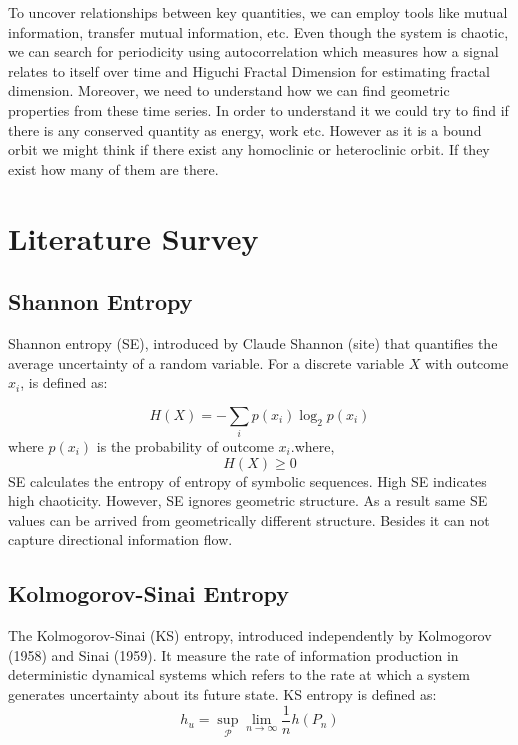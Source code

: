 \documentclass[%
reprint,
amsmath,amssymb,
aps,
floatfix,
]{revtex4-2}
\begin{document}
	To uncover relationships between key quantities, we can employ tools like mutual information, transfer mutual information, etc. Even though the system is chaotic, we can search for periodicity using autocorrelation which measures how a signal relates to itself over time and Higuchi Fractal Dimension for estimating fractal dimension.  Moreover, we need to understand how we can find geometric properties from these time series.
	In order to understand it we could try to find if there is any conserved quantity as energy, work etc. However as it is a bound orbit we might think if there exist any homoclinic or heteroclinic orbit. If they exist how many of them are there. 
	\section{Literature Survey}
	\subsection{Shannon Entropy}
	Shannon entropy (SE), introduced by Claude Shannon (site) that quantifies the average uncertainty of a random variable. For a discrete variable $X$ with outcome ${x_i}$, is defined as:
	
	\begin{equation}
		H(X) = -\sum_{i} p(x_i) \log_2 p(x_i)
		\label{eq:shannon}
	\end{equation}
	where $p(x_i)$ is the probability of outcome $x_i$.where,
	\[
	H(X) \geq 0
	\]
	SE calculates the entropy of entropy of symbolic sequences. High SE indicates high chaoticity. However, SE ignores geometric structure. As a result same SE values can be arrived from geometrically different  structure. Besides it can not capture directional information flow.\\
	\subsection{Kolmogorov-Sinai Entropy}
	The Kolmogorov-Sinai (KS) entropy, introduced independently by Kolmogorov (1958) and Sinai (1959). It measure the rate of information production in deterministic dynamical systems which refers to the rate at which a system generates uncertainty about its future state. KS entropy is defined as:
	\begin{equation}
		h_u  = \operatorname*{sup}_{\mathcal{P}} \operatorname*{\lim}_{n \to \infty} \frac{1}{n} h(P_n)	
	\end{equation}
\end{document}
